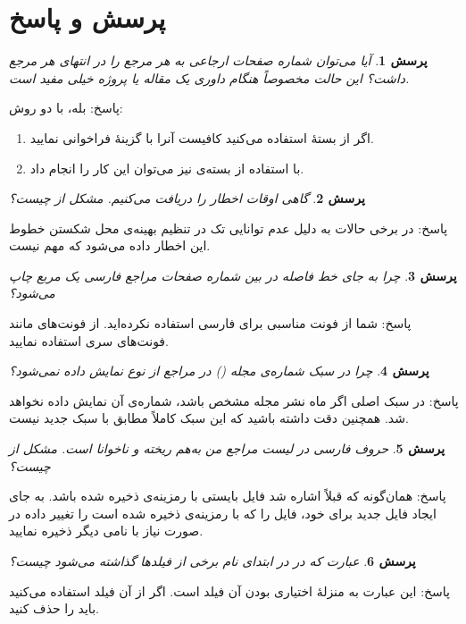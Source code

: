 \documentclass{article}
\theoremstyle{plain}\newtheorem{question}{پرسش}
\newcommand{\answer}{{\noindent \Sayeh پاسخ: }}
\newcommand\SLASH{\char`\\}
\begin{document}
\section{پرسش و پاسخ} 
\begin{question} آیا می‌توان شماره صفحات ارجاعی به هر مرجع را در انتهای هر مرجع داشت؟ این حالت مخصوصاً هنگام‌ داوری یک مقاله یا پروژه 
خیلی مفید است.
\end{question}
\answer
بله، با دو روش:
\begin{enumerate}
\item
اگر از بستهٔ  استفاده می‌کنید کافیست آنرا با گزینهٔ  فراخوانی نمایید.
\item
با استفاده از بسته‌ی  نیز می‌توان این کار را انجام داد.
\end{enumerate}

\begin{question} گاهی اوقات اخطار \lr{Underfull \SLASH hbox} را دریافت می‌کنیم. مشکل از چیست؟ \end{question}
\answer در برخی حالات به دلیل عدم توانایی تک در تنظیم بهینه‌ی محل شکستن خطوط این اخطار داده می‌شود که مهم نیست.

\begin{question} چرا به جای خط فاصله در بین شماره صفحات مراجع فارسی یک مربع چاپ می‌شود؟ \end{question}
\answer شما از فونت‌ مناسبی برای فارسی استفاده نکرده‌اید. از فونت‌های مانند فونت‌های سری  استفاده نمایید. 

\begin{question} چرا در سبک   شماره‌ی مجله () در مراجع از نوع  نمایش داده نمی‌شود؟ \end{question}
\answer در سبک اصلی  اگر ماه نشر مجله مشخص باشد، شماره‌ی آن نمایش داده نخواهد شد.
 همچنین دقت داشته باشید که این سبک کاملاً مطابق با سبک جدید  نیست.

\begin{question} حروف فارسی در لیست مراجع من به‌هم ریخته و ناخوانا است. مشکل از چیست؟ \end{question}
\answer همان‌گونه که قبلاً اشاره شد فایل  بایستی با رمزینه‌ی  ذخیره شده باشد. به جای ایجاد فایل  جدید برای خود، 
فایل  را که با رمزینه‌ی  ذخیره شده است را تغییر داده در صورت نیاز با نامی دیگر ذخیره نمایید. 

\begin{question} عبارت  که در  در ابتدای نام برخی از فیلدها گذاشته می‌شود چیست؟ \end{question}
\answer این عبارت به منزله‌ٔ اختیاری بودن آن فیلد است. اگر از آن فیلد استفاده می‌کنید باید  را حذف کنید.
\end{document}
